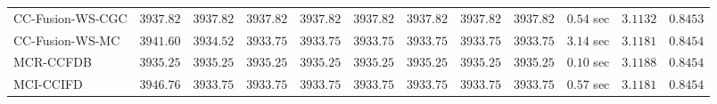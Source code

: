 \begin{table}[H]
\begin{tabular}{lrrrrrrrrrrr}
    CC-Fusion-WS-CGC & $      3937.82$ & $      3937.82$ & $      3937.82$ & $      3937.82$ & $      3937.82$ & $      3937.82$ & $      3937.82$ & $      3937.82$ & $         0.54$ sec    & $       3.1132$  & $       0.8453$ \\ 
     CC-Fusion-WS-MC & $      3941.60$ & $      3934.52$ & $      3933.75$ & $      3933.75$ & $      3933.75$ & $      3933.75$ & $      3933.75$ & $      3933.75$ & $         3.14$ sec    & $       3.1181$  & $       0.8454$ \\ 
\cmidrule{1-1} 
           MCR-CCFDB & $      3935.25$ & $      3935.25$ & $      3935.25$ & $      3935.25$ & $      3935.25$ & $      3935.25$ & $      3935.25$ & $      3935.25$ & $         0.10$ sec    & $       3.1188$  & $       0.8454$ \\ 
\cmidrule{1-1} 
           MCI-CCIFD & $      3946.76$ & $      3933.75$ & $      3933.75$ & $      3933.75$ & $      3933.75$ & $      3933.75$ & $      3933.75$ & $      3933.75$ & $         0.57$ sec    & $       3.1181$  & $       0.8454$ \\ 
\bottomrule
\end{tabular}
\end{table}

